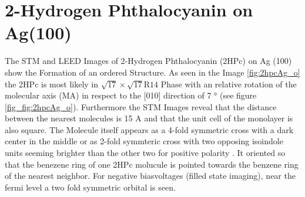 \section{2-Hydrogen Phthalocyanin on Ag(100)}
\label{sec:results}The STM and LEED Images of 2-Hydrogen Phthalocyanin (2HPc) on Ag (100) show the Formation of an ordered Structure.
As seen in the Image \ref{fig:2hpcAg_o} the 2HPc  is most likely in $\sqrt{17} \times  \sqrt{17}\text{R}14$ Phase with an relative rotation of the molecular axis (MA) in respect to the [010] direction of 7 ° (see figure \ref{fig_fig:2hpcAg_o}). 
Furthermore the STM Images reveal that the distance between the nearest molecules is 
15 A and that the unit cell of the monolayer is also square.
\noindent The Molecule itself appears as a 4-fold symmetric cross with a dark center in the middle or as 2-fold symmteric cross with two opposing isoindole units seeming brighter than the other two for positive polarity . 
It oriented so that the benezene ring of one 2HPc molucule is pointed towards the benzene ring of the nearest neighbor. 
For negative biasvoltages (filled state imaging), near the fermi level a two fold symmetric orbital is seen. 
